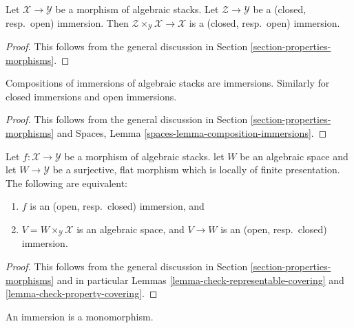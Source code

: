 \begin{lemma}
\label{lemma-base-change-immersion}
Let $\mathcal{X} \to \mathcal{Y}$ be a morphism of algebraic stacks.
Let $\mathcal{Z} \to \mathcal{Y}$ be a
(closed, resp.\ open) immersion.
Then $\mathcal{Z} \times_\mathcal{Y} \mathcal{X} \to \mathcal{X}$
is a (closed, resp.\ open) immersion.
\end{lemma}

\begin{proof}
This follows from the general discussion in
Section \ref{section-properties-morphisms}.
\end{proof}

\begin{lemma}
\label{lemma-composition-immersion}
Compositions of immersions of algebraic stacks are immersions.
Similarly for closed immersions and open immersions.
\end{lemma}

\begin{proof}
This follows from the general discussion in
Section \ref{section-properties-morphisms}
and
Spaces, Lemma \ref{spaces-lemma-composition-immersions}.
\end{proof}

\begin{lemma}
\label{lemma-check-immersion-covering}
Let $f : \mathcal{X} \to \mathcal{Y}$ be a morphism of algebraic stacks.
let $W$ be an algebraic space and let $W \to \mathcal{Y}$ be a surjective,
flat morphism which is locally of finite presentation. The following
are equivalent:
\begin{enumerate}
\item $f$ is an (open, resp.\ closed) immersion, and
\item $V = W \times_\mathcal{Y} \mathcal{X}$ is an algebraic space, and
$V \to W$ is an (open, resp.\ closed) immersion.
\end{enumerate}
\end{lemma}

\begin{proof}
This follows from the general discussion in
Section \ref{section-properties-morphisms}
and in particular
Lemmas \ref{lemma-check-representable-covering} and
\ref{lemma-check-property-covering}.
\end{proof}

\begin{lemma}
\label{lemma-immersion-monomorphism}
An immersion is a monomorphism.
\end{lemma}

